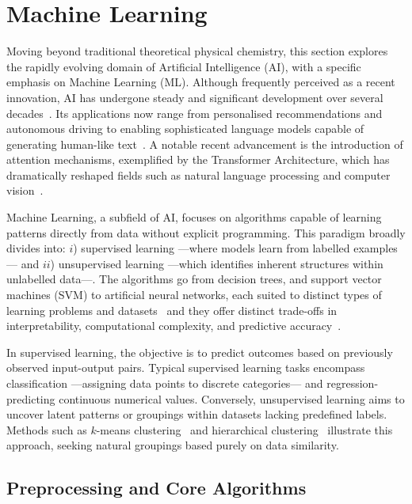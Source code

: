 \newpage
\section{Machine Learning}

Moving beyond traditional theoretical physical chemistry, this section explores
the rapidly evolving domain of Artificial Intelligence (\gls{AI}), with a
specific emphasis on Machine Learning (\gls{ML}). Although frequently perceived
as a recent innovation, \gls{AI} has undergone steady and significant
development over several decades~\cite{RussellNorvig2010}. Its applications now
range from personalised recommendations and autonomous driving to enabling
sophisticated language models capable of generating human-like
text~\cite{LeCun2015,Silver2016}. A notable recent advancement is the
introduction of attention mechanisms, exemplified by the Transformer
Architecture, which has dramatically reshaped fields such as natural language
processing and computer vision~\cite{Vaswani2017}.

\vspace{1em}%
Machine Learning, a subfield of \gls{AI}, focuses on algorithms capable of
learning patterns directly from data without explicit programming. This
paradigm broadly divides into: $i$) supervised learning ---where models learn
from labelled examples--- and $ii$) unsupervised learning ---which identifies
inherent structures within unlabelled data---. The algorithms go from
decision trees, and support vector machines (\gls{SVM}) to artificial neural
networks, each suited to distinct types of learning problems and
datasets~\cite{Goodfellow2016,Hastie2009} and they offer distinct trade-offs in
interpretability, computational complexity, and predictive
accuracy~\cite{Murphy2012,Bishop2006}.

\vspace{1em}%
In supervised learning, the objective is to predict outcomes based on
previously observed input-output pairs. Typical supervised learning tasks
encompass classification ---assigning data points to discrete categories--- and
regression-predicting continuous numerical values. Conversely, unsupervised
learning aims to uncover latent patterns or groupings within datasets lacking
predefined labels. Methods such as $k$-means clustering~\cite{Lloyd1982} and
hierarchical clustering~\cite{Johnson1967} illustrate this approach, seeking
natural groupings based purely on data similarity.

\newpage
\subsection{Preprocessing and Core Algorithms}

